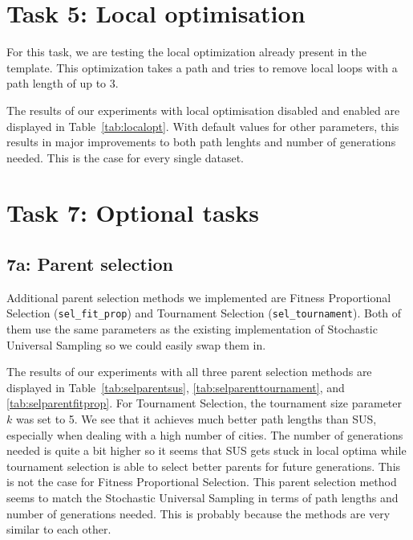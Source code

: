 \documentclass{report}
\begin{document}
\section{Task 5: Local optimisation}
\label{sec:local}
For this task, we are testing the local optimization already present in the template. This optimization takes a path and tries to remove local loops with a path length of up to 3.

The results of our experiments with local optimisation disabled and enabled are displayed in Table~\ref{tab:localopt}. With default values for other parameters, this results in major improvements to both path lenghts and number of generations needed. This is the case for every single dataset.



\section{Task 7: Optional tasks}
\subsection{7a: Parent selection}
Additional parent selection methods we implemented are Fitness Proportional Selection (\texttt{sel\_fit\_prop}) and Tournament Selection (\texttt{sel\_tournament}). Both of them use the same parameters as the existing implementation of Stochastic Universal Sampling so we could easily swap them in.

The results of our experiments with all three parent selection methods are displayed in Table~\ref{tab:selparentsus}, \ref{tab:selparenttournament}, and \ref{tab:selparentfitprop}. For Tournament Selection, the tournament size parameter $k$ was set to 5. We see that it achieves much better path lengths than SUS, especially when dealing with a high number of cities. The number of generations needed is quite a bit higher so it seems that SUS gets stuck in local optima while tournament selection is able to select better parents for future generations. This is not the case for Fitness Proportional Selection. This parent selection method seems to match the Stochastic Universal Sampling in terms of path lengths and number of generations needed. This is probably because the methods are very similar to each other.
\end{document}
